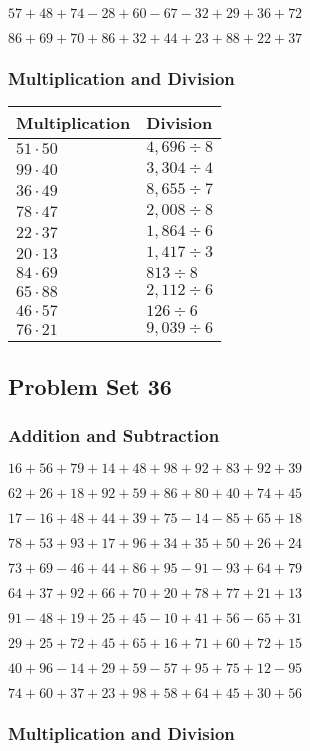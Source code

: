 \(57+48+74-28+60-67-32+29+36+72\)

\(86+69+70+86+32+44+23+88+22+37\)

\hypertarget{multiplication-and-division-75}{%
\subsubsection{Multiplication and
Division}\label{multiplication-and-division-75}}

\begin{longtable}[]{@{}ll@{}}
\toprule
Multiplication & Division\tabularnewline
\midrule
\endhead
\(51\cdot50\) & \(4,696÷8\)\tabularnewline
\(99\cdot40\) & \(3,304÷4\)\tabularnewline
\(36\cdot49\) & \(8,655÷7\)\tabularnewline
\(78\cdot47\) & \(2,008÷8\)\tabularnewline
\(22\cdot37\) & \(1,864÷6\)\tabularnewline
\(20\cdot13\) & \(1,417÷3\)\tabularnewline
\(84\cdot69\) & \(813÷8\)\tabularnewline
\(65\cdot88\) & \(2,112 ÷6\)\tabularnewline
\(46\cdot57\) & \(126÷6\)\tabularnewline
\(76\cdot21\) & \(9,039÷6\)\tabularnewline
\bottomrule
\end{longtable}

\hypertarget{problem-set-36-1}{%
\subsection{Problem Set 36}\label{problem-set-36-1}}

\hypertarget{addition-and-subtraction-76}{%
\subsubsection{Addition and
Subtraction}\label{addition-and-subtraction-76}}

\(16+56+79+14+48+98+92+83+92+ 39\)

\(62+26+18+92+59+86+80+40+74+45\)

\(17-16+48+44+39+75-14-85+65+18\)

\(78+53+93+17+96+34+35+50+26+24\)

\(73+69-46+44+86+95-91-93+64+79\)

\(64+37+92+66+70+20+78+77+21+13\)

\(91-48+19+25+45-10+41+56-65+31\)

\(29+25+72+45+65+16+71+60+72+15\)

\(40+96-14+29+59-57+95+75+12-95\)

\(74+60+37+23+98+58+64+45+30+56\)

\hypertarget{multiplication-and-division-76}{%
\subsubsection{Multiplication and
Division}\label{multiplication-and-division-76}}

